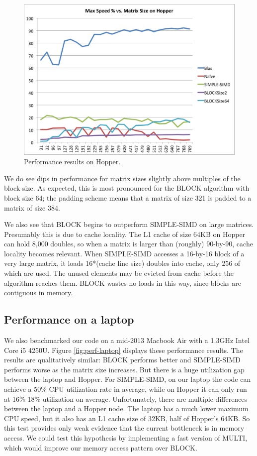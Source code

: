 \documentclass{article}
\begin{document}
\begin{figure}
  \includegraphics[width=\textwidth]{HopperChart1}
  \caption{Performance results on Hopper.}
  \label{fig:perf-hopper}
\end{figure}

We do see dips in performance for matrix sizes slightly above multiples of the block size.  As expected, this is most pronounced for the BLOCK algorithm with block size 64; the padding scheme means that a matrix of size 321 is padded to a matrix of size 384.

We also see that BLOCK begins to outperform SIMPLE-SIMD on large matrices.  Presumably this is due to cache locality.  The L1 cache of size 64KB on Hopper can hold 8,000 doubles, so when a matrix is larger than (roughly) 90-by-90, cache locality becomes relevant.  When SIMPLE-SIMD accesses a 16-by-16 block of a very large matrix, it loads 16*(cache line size) doubles into cache, only 256 of which are used.  The unused elements may be evicted from cache before the algorithm reaches them.  BLOCK wastes no loads in this way, since blocks are contiguous in memory.

\subsection{Performance on a laptop}
We also benchmarked our code on a mid-2013 Macbook Air with a 1.3GHz Intel Core i5 4250U.  Figure \ref{fig:perf-laptop} displays these performance results.  The results are qualitatively similar: BLOCK performs better and SIMPLE-SIMD performs worse as the matrix size increases.  But there is a huge utilization gap between the laptop and Hopper. For SIMPLE-SIMD, on our laptop the code can achieve a 50\% CPU utilization rate in average, while on Hopper it can only run at 16\%-18\% utilization on average.  Unfortunately, there are multiple differences between the laptop and a Hopper node.  The laptop has a much lower maximum CPU speed, but it also has an L1 cache size of 32KB, half of Hopper's 64KB.  So this test provides only weak evidence that the current bottleneck is in memory access.  We could test this hypothesis by implementing a fast version of MULTI, which would improve our memory access pattern over BLOCK.
\end{document}
